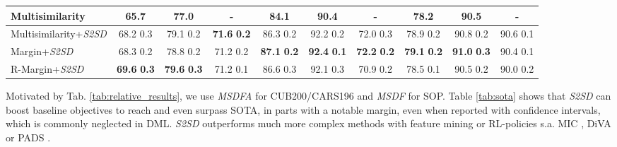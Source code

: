 \documentclass{article} \usepackage{arxiv_style,times}
\begin{document}
\begin{table*}[t]
{\begin{tabular}{l || c | c | c || c | c | c || c | c | c}
     \rowcolor{vvlightgray}
     Multisimilarity \citep{multisimilarity} & 65.7 & 77.0 & - & 84.1 & 90.4 & -  & 78.2 & 90.5 & -   \\
     \hline
     Multisimilarity+\textit{S2SD}             & 68.2  0.3 & 79.1  0.2 & \textbf{71.6}  \textbf{0.2} & 86.3  0.2 & 92.2  0.2 & 72.0  0.3 & 78.9  0.2 & 90.8  0.2 & 90.6  0.1\\
     Margin+\textit{S2SD}                      & 68.3  0.2 & 78.8  0.2 & 71.2  0.2 & \textbf{87.1}  \textbf{0.2} & \textbf{92.4}  \textbf{0.1} & \textbf{72.2}  \textbf{0.2} & \textbf{79.1}  \textbf{0.2} & \textbf{91.0}  \textbf{0.3} & 90.4  0.1\\
     R-Margin+\textit{S2SD}                    & \textbf{69.6}  \textbf{0.3} & \textbf{79.6}  \textbf{0.3} & 71.2  0.1 & 86.6  0.3 & 92.1  0.3 & 70.9  0.2 & 78.5  0.1 & 90.5  0.2 & 90.0  0.2\\
     \bottomrule
\end{tabular}}

\label{tab:sota}
\end{table*}






































 Motivated by Tab. \ref{tab:relative_results}, we use \textit{MSDFA} for CUB200/CARS196 and \textit{MSDF} for SOP. Table \ref{tab:sota} shows that \textit{S2SD} can boost baseline objectives to reach and even surpass SOTA, in parts with a notable margin, even when reported with confidence intervals, which is commonly neglected in DML. \textit{S2SD} outperforms much more complex methods with feature mining or RL-policies s.a. MIC \citep{mic}, DiVA \citep{milbich2020diva} or PADS \citep{roth2020pads}. 
\end{document}
